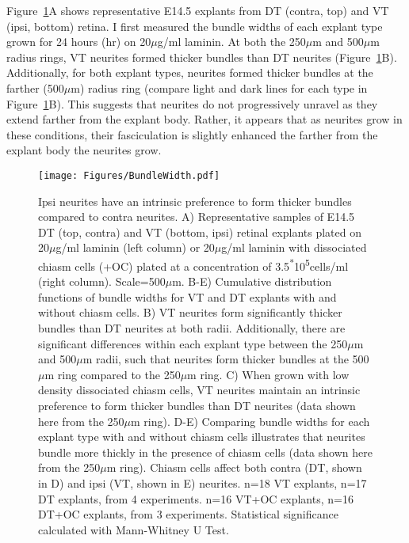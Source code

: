 Figure~\ref{Figures/BundleWidth}A shows representative E14.5 explants from DT (contra, top) and VT (ipsi, bottom) retina.
I first measured the bundle widths of each explant type grown for 24 hours (hr) on 20$\mu$g/ml laminin.
At both the 250$\mu$m and 500$\mu$m radius rings, VT neurites formed thicker bundles than DT neurites (Figure~\ref{Figures/BundleWidth}B).
Additionally, for both explant types, neurites formed thicker bundles at the farther (500$\mu$m) radius ring (compare light and dark lines for each type in Figure~\ref{Figures/BundleWidth}B).
This suggests that neurites do not progressively unravel as they extend farther from the explant body.
Rather, it appears that as neurites grow in these conditions, their fasciculation is slightly enhanced the farther from the explant body the neurites grow.
\begin{figure}[hbtp]
    \begin{center}
        \texttt{[image: Figures/BundleWidth.pdf]}
        \caption[Ipsi neurites have an intrinsic preference to form thicker bundles \invitro{} compared to contra neurites.]
        {Ipsi neurites have an intrinsic preference to form thicker bundles \invitro{} compared to contra neurites.
        A) Representative samples of E14.5 DT (top, contra) and VT (bottom, ipsi) retinal explants plated on 20$\mu$g/ml laminin (left column) or 20$\mu$g/ml laminin with dissociated chiasm cells (+OC) plated at a concentration of 3.5\textsuperscript{*}10\textsuperscript{5}cells/ml (right column).
        Scale=500$\mu$m.
        B-E) Cumulative distribution functions of bundle widths for VT and DT explants with and without chiasm cells.
        B) VT neurites form significantly thicker bundles than DT neurites at both radii.
        Additionally, there are significant differences within each explant type between the 250$\mu$m and 500$\mu$m radii, such that neurites form thicker bundles at the 500$\mu$m ring compared to the 250$\mu$m ring.
        C) When grown with low density dissociated chiasm cells, VT neurites maintain an intrinsic preference to form thicker bundles than DT neurites (data shown here from the 250$\mu$m ring).
        D-E) Comparing bundle widths for each explant type with and without chiasm cells illustrates that neurites bundle more thickly in the presence of chiasm cells (data shown here from the 250$\mu$m ring).
        Chiasm cells affect both contra (DT, shown in D) and ipsi (VT, shown in E) neurites.
        n=18 VT explants, n=17 DT explants, from 4 experiments.
        n=16 VT+OC explants, n=16 DT+OC explants, from 3 experiments.
        Statistical significance calculated with Mann-Whitney U Test.
        }
        \label{Figures/BundleWidth}
    \end{center}
\end{figure}


